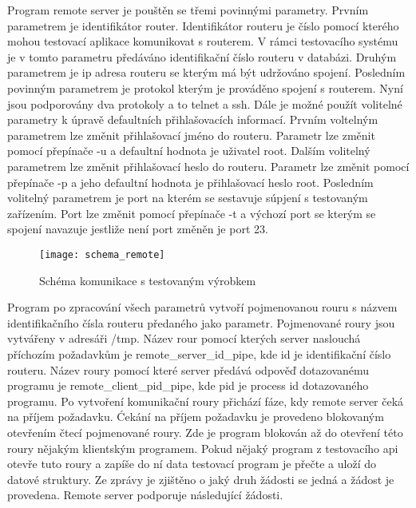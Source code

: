 Program remote server je pouštěn se třemi povinnými parametry. Prvním parametrem je identifikátor router. Identifikátor routeru je číslo pomocí kterého mohou testovací aplikace komunikovat s routerem. V rámci testovacího systému je v tomto parametru předáváno identifikační číslo routeru v databázi. Druhým parametrem je ip adresa routeru se kterým má být udržováno spojení. Posledním povinným parametrem je protokol kterým je prováděno spojení s routerem. Nyní jsou podporovány dva protokoly a to telnet a ssh. Dále je možné použít volitelné parametry k úpravě defaultních přihlašovacích informací. Prvním voltelným parametrem lze změnit přihlašovací jméno do routeru. Parametr lze změnit pomocí přepínače -u a defaultní hodnota je uživatel root. Dalším volitelný parametrem lze změnit přihlašovací heslo do routeru. Parametr lze změnit pomocí přepínače -p a jeho defaultní hodnota je přihlašovací heslo root. Posledním volitelný parametrem je port na kterém se sestavuje súpjení s testovaným zařízením. Port lze změnit pomocí přepínače -t a výchozí port se kterým se spojení navazuje jestliže není port změněn je port 23.

\begin{figure}[h]
  \centering
  \texttt{[image: schema\_remote]}
  \caption{Schéma komunikace s testovaným výrobkem}
  \label{fig:schema_remote}
\end{figure}

Program po zpracování všech parametrů vytvoří pojmenovanou rouru s názvem identifikačního čísla routeru předaného jako parametr. Pojmenované roury jsou vytvářeny v adresáři /tmp. Název rour pomocí kterých server naslouchá příchozím požadavkům je remote\_server\_id\_pipe, kde id je identifikační číslo routeru. Název roury pomocí které server předává odpověď dotazovanému programu je remote\_client\_pid\_pipe, kde pid je process id dotazovaného programu. Po vytvoření komunikační roury přichází fáze, kdy remote server čeká na příjem požadavku. Ćekání na příjem požadavku je provedeno blokovaným otevřením čtecí pojmenované roury. Zde je program blokován až do otevření této roury nějakým klientským programem. Pokud nějaký program z testovacího api otevře tuto roury a zapíše do ní data testovací program je přečte a uloží do datové struktury. Ze zprávy je zjištěno o jaký druh žádosti se jedná a žádost je provedena. Remote server podporuje následující žádosti.

